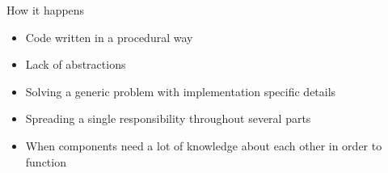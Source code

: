 \documentclass[xcolor=svgnames]{beamer}
\begin{document}



{%
%
\begin{frame}{\subsecname}

    How it happens
    \begin{itemize}
        \pause \item Code written in a procedural way
        \pause \item Lack of abstractions
        \pause \item Solving a generic problem with implementation specific details
        \pause \item Spreading a single responsibility throughout several parts
        \pause \item When components need a lot of knowledge about each other in
            order to function
    \end{itemize}
\end{frame}
}


{%
%
\begin{frame}{\subsecname}
    \begin{minipage}{\columnwidth}
    \end{minipage}
\end{frame}
}


{%
%
\begin{frame}{\subsecname}
    \begin{minipage}{\columnwidth}
    \end{minipage}
\end{frame}
}
\end{document}
